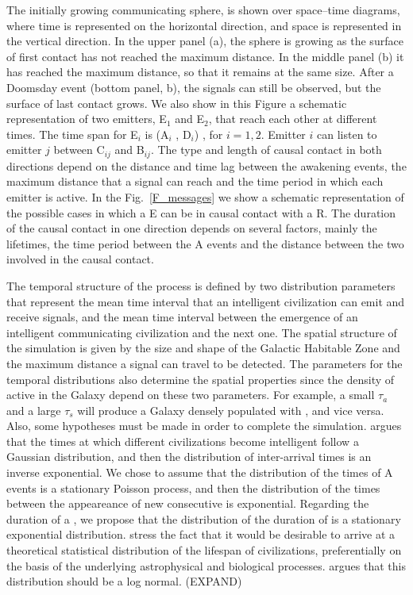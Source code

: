 The initially growing communicating sphere, is shown over
space--time diagrams, where time is represented on the horizontal
direction, and space is represented in the vertical direction.
%
In the upper panel (a), the sphere is growing as the surface of first
contact has not reached the maximum distance.
%
In the middle panel (b) it has reached the maximum distance, so that
it remains at the same size.
%
After a Doomsday event (bottom panel, b), the signals can still be
observed, but the surface of last contact grows.
%
We also show in this Figure a schematic representation of two
emitters, E$_1$ and E$_2$, that reach each other at different times.
%
The time span for E$_i$ is (A$_i$ , D$_i$) , for $i = {1, 2}$.
%
Emitter $i$ can listen to emitter $j$ between C$_{ij}$ and B$_{ij}$.
%
The type and length of causal contact in both directions depend on the
distance and time lag between the awakening events, the maximum
distance that a signal can reach and the time period in which each
emitter is active.
%
%
In the Fig.~\ref{F_messages} we show a schematic representation of the
possible cases in which a \ceti{} E can be in causal contact with a
\ceti{}
R.
%
The duration of the causal contact in one direction depends on several
factors, mainly the lifetimes, the time period between the A events 
and the distance between the two \cetis{} involved in the causal
contact.



The temporal structure of the process is defined by two distribution
parameters that represent the mean time interval that an intelligent
civilization can emit and receive signals, and the mean time interval
between the emergence of an intelligent communicating civilization and
the next one.
%
The spatial structure of the simulation is given by the size and shape
of the Galactic Habitable Zone and the maximum distance a signal can
travel to be detected.
%
The parameters for the temporal distributions also determine the
spatial properties since the density of active \cetis{} in the Galaxy
depend on these two parameters.
%
For example, a small $\tau_a$ and a large $\tau_s$ will produce a
Galaxy densely populated with \cetis{}, and vice versa.
%
Also, some hypotheses must be made in order to complete the
simulation.
%
\citet{forgan_spatiotemporal_2011} argues that the times at which
different civilizations become intelligent follow a Gaussian
distribution, and then the distribution of inter-arrival times is an
inverse exponential.
%
We chose to assume that the distribution of the times of A events is a
stationary Poisson process, and then the distribution of the times
between the appeareance of new consecutive \cetis{} is exponential.
%
Regarding the duration of a \ceti{}, we propose that the distribution of
the duration of \cetis{} is a stationary exponential distribution.
%
\citet{balbi_impact_2018} stress the fact that it would be desirable
to arrive at a theoretical statistical distribution of the lifespan of
civilizations, preferentially on the basis of the underlying
astrophysical and biological processes.
%
\citet{maccone_lognormals_2014} argues that this distribution should
be a log normal.  (EXPAND)
 



